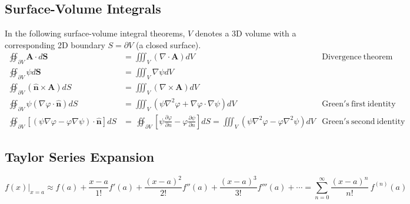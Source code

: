 \documentclass[11pt]{article}
\begin{document}
\subsection*{Surface-Volume Integrals}
In the following surface-volume integral theorems, $V$ denotes a 3D volume with a corresponding 2D boundary $S = \partial V$ (a closed surface).
\begin{align*}
\oiint_{\partial V}\mathbf{A}\cdot d\mathbf{S}&=\iiint_V \left(\nabla \cdot \mathbf{A}\right)dV &\mathrm{Divergence\ theorem}\\
\oiint_{\partial V}\psi d \mathbf{S} &= \iiint_V \nabla \psi dV & \\
\oiint_{\partial V}\left(\hat{\mathbf{n}}\times\mathbf{A}\right)dS&=\iiint _{V}\left(\nabla\times\mathbf{A}\right)dV  \\
\oiint_{\partial V}\psi\left(\nabla\varphi\cdot\hat{\mathbf{n}}\right)dS &= \iiint _{V}\left(\psi\nabla^{2}\varphi+\nabla\varphi\cdot\nabla\psi\right)dV &\mathrm{Green's\ first\ identity}\\
\oiint_{\partial V}\left[\left(\psi\nabla\varphi-\varphi\nabla\psi\right)\cdot\hat{\mathbf{n}}\right]dS&=\,\!\oiint_{\partial V}\left[\psi\frac{\partial\varphi}{\partial n}-\varphi\frac{\partial\psi}{\partial n}\right]dS \displaystyle=\iiint_{V}\left(\psi\nabla^{2}\varphi-\varphi\nabla^{2}\psi\right)dV &\mathrm{Green's\ second\ identity}
\end{align*}

\subsection*{Taylor Series Expansion}
\[f(x)|_{x=a}\approx f(a)+\frac {x-a}{1!}f'(a)+ \frac{(x-a)^2}{2!}f''(a) +\frac{(x-a)^3}{3!}f'''(a) + \cdots = \sum_{n=0} ^ {\infty} \frac {(x-a)^{n}}{n!} \, f^{(n)}(a)\]
\end{document}
